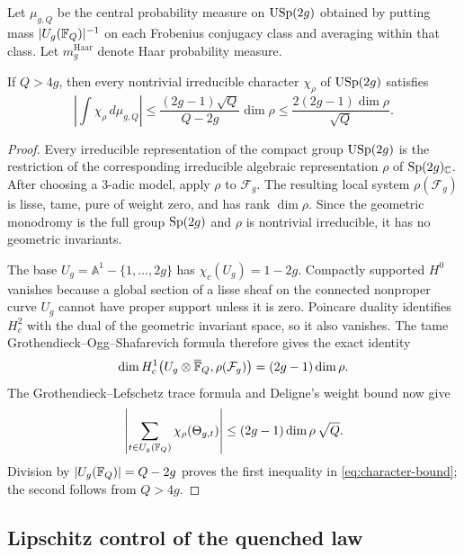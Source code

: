 Let \(\mu_{g,Q}\) be the central probability measure on \(\mathrm{USp}(2g)\)
obtained by putting mass \(|U_g(\mathbb F_Q)|^{-1}\) on each Frobenius conjugacy
class and averaging within that class.  Let \(m_g^{\mathrm{Haar}}\) denote
Haar probability measure.

\begin{proposition}
\label{prop:character-equidistribution}
If \(Q>4g\), then every nontrivial irreducible character \(\chi_\rho\)
of \(\mathrm{USp}(2g)\) satisfies
\begin{equation}
 \left|\int\chi_\rho\,d\mu_{g,Q}\right|
 \le \frac{(2g-1)\sqrt Q}{Q-2g}\dim\rho
 \le \frac{2(2g-1)\dim\rho}{\sqrt Q}.
\label{eq:character-bound}
\end{equation}
\end{proposition}

\begin{proof}
Every irreducible representation of the compact group \(\mathrm{USp}(2g)\) is the
restriction of the corresponding irreducible algebraic representation
\(\rho\) of \(\mathrm{Sp}(2g)_{\mathbb C}\).  After choosing a \(3\)-adic model,
apply \(\rho\) to \(\mathcal F_g\).  The resulting local system
\(\rho(\mathcal F_g)\) is lisse, tame, pure of weight zero, and has rank
\(\dim\rho\).  Since the geometric monodromy is the full group \(\mathrm{Sp}(2g)\)
and \(\rho\) is nontrivial irreducible, it has no geometric invariants.

The base \(U_g=\mathbb A^1-\{1,\ldots,2g\}\) has
\(\chi_c(U_g)=1-2g\).  Compactly supported \(H^0\) vanishes because a global
section of a lisse sheaf on the connected nonproper curve \(U_g\) cannot have
proper support unless it is zero.  Poincare duality identifies \(H_c^2\) with
the dual of the geometric invariant space, so it also vanishes.  The tame
Grothendieck--Ogg--Shafarevich formula
\cite[Part~I, Theorem~1 and (2 bis), pp.~133--134]{Raynaud1966} therefore
gives the exact identity
\[
 \dim H_c^1\bigl(U_g\otimes\overline{\mathbb F}_Q,
                         \rho(\mathcal F_g)\bigr)
 =(2g-1)\dim\rho.
\]
The Grothendieck--Lefschetz trace formula and Deligne's weight bound
\cite[Theorem~3.3.1]{Deligne1980} now give
\[
 \left|\sum_{t\in U_g(\mathbb F_Q)}\chi_\rho(\Theta_{g,t})\right|
 \le (2g-1)\dim\rho\,\sqrt Q.
\]
Division by \(|U_g(\mathbb F_Q)|=Q-2g\) proves the first inequality in
\eqref{eq:character-bound}; the second follows from \(Q>4g\).
\end{proof}

\subsection{Lipschitz control of the quenched law}

